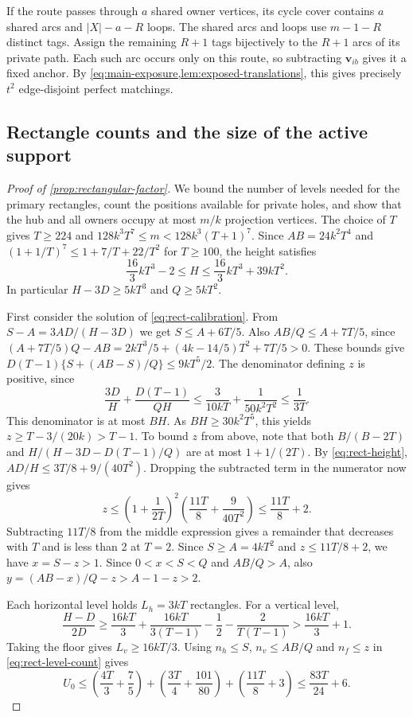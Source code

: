 \documentclass[10pt]{article}
\numberwithin{equation}{section}
\theoremstyle{definition}
\begin{document}
If the route passes through $a$ shared owner vertices, its cycle cover contains $a$ shared arcs and $|X|-a-R$ loops. The shared arcs and loops use $m-1-R$ distinct tags. Assign the remaining $R+1$ tags bijectively to the $R+1$ arcs of its private path. Each such arc occurs only on this route, so subtracting $\mathbf v_{ib}$ gives it a fixed anchor. By \cref{eq:main-exposure,lem:exposed-translations}, this gives precisely $t^2$ edge-disjoint perfect matchings.

\subsection{Rectangle counts and the size of the active support}\label{app:rect-support}

\begin{proof}[Proof of \cref{prop:rectangular-factor}]
We bound the number of levels needed for the primary rectangles, count the positions available for private holes, and show that the hub and all owners occupy at most $m/k$ projection vertices. The choice of $T$ gives $T\ge224$ and $128k^3T^7\le m<128k^3(T+1)^7$. Since $AB=24k^2T^4$ and $(1+1/T)^7\le1+7/T+22/T^2$ for $T\ge100$, the height satisfies
\begin{equation}\label{eq:rect-height}
 \frac{16}{3}kT^3-2\le H\le\frac{16}{3}kT^3+39kT^2 .
\end{equation}
In particular $H-3D\ge5kT^3$ and $Q\ge5kT^2$.

First consider the solution of \cref{eq:rect-calibration}. From $S-A=3AD/(H-3D)$ we get $S\le A+6T/5$. Also $AB/Q\le A+7T/5$, since $(A+7T/5)Q-AB=2kT^3/5+(4k-14/5)T^2+7T/5>0$. These bounds give $D(T-1)\{S+(AB-S)/Q\}\le9kT^5/2$. The denominator defining $z$ is positive, since
\[
 \frac{3D}{H}+\frac{D(T-1)}{QH}
 \le\frac{3}{10kT}+\frac1{50k^2T^2}\le\frac1{3T}.
\]
This denominator is at most $BH$. As $BH\ge30k^2T^5$, this yields $z\ge T-3/(20k)>T-1$. To bound $z$ from above, note that both $B/(B-2T)$ and $H/(H-3D-D(T-1)/Q)$ are at most $1+1/(2T)$. By \cref{eq:rect-height}, $AD/H\le3T/8+9/(40T^2)$. Dropping the subtracted term in the numerator now gives
\[
 z\le\left(1+\frac1{2T}\right)^2
       \left(\frac{11T}{8}+\frac9{40T^2}\right)\le\frac{11T}{8}+2 .
\]
Subtracting $11T/8$ from the middle expression gives a remainder that decreases with $T$ and is less than 2 at $T=2$. Since $S\ge A=4kT^2$ and $z\le11T/8+2$, we have $x=S-z>1$. Since $0<x<S<Q$ and $AB/Q>A$, also $y=(AB-x)/Q-z>A-1-z>2$.

Each horizontal level holds $L_h=3kT$ rectangles. For a vertical level,
\[
 \frac{H-D}{2D}
 \ge\frac{16kT}{3}+\frac{16kT}{3(T-1)}-\frac12-\frac{2}{T(T-1)}
 >\frac{16kT}{3}+1.
\]
Taking the floor gives $L_v\ge16kT/3$. Using $n_h\le S$, $n_v\le AB/Q$ and $n_f\le z$ in \cref{eq:rect-level-count} gives
\begin{equation}\label{eq:rect-levels}
 U_0\le\left(\frac{4T}{3}+\frac75\right)
      +\left(\frac{3T}{4}+\frac{101}{80}\right)
      +\left(\frac{11T}{8}+3\right)
 \le\frac{83T}{24}+6.
\end{equation}


\end{proof}
\end{document}
